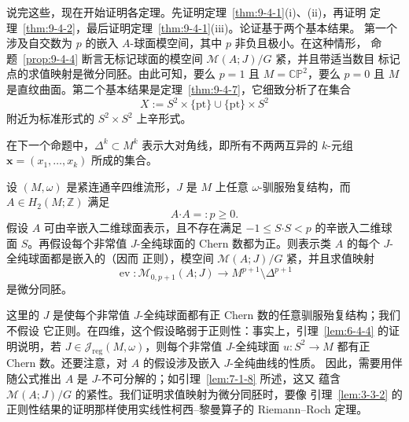 说完这些，现在开始证明各定理。先证明定理~\ref{thm:9-4-1}(i)、(ii)，再证明
定理~\ref{thm:9-4-2}，最后证明定理~\ref{thm:9-4-1}(iii)。论证基于两个基本结果。
第一个涉及自交数为 $p$ 的嵌入 $A$-球面模空间，其中 $p$ 非负且极小。在这种情形，
命题~\ref{prop:9-4-4} 断言无标记球面的模空间 $\mathcal M(A;J)/G$ 紧，并且带适当数目
标记点的求值映射是微分同胚。由此可知，要么 $p=1$ 且 $M=\mathbb{CP}^2$，要么
$p=0$ 且 $M$ 是直纹曲面。第二个基本结果是定理~\ref{thm:9-4-7}，它细致分析了在集合
\[
  X:=S^2\times\{\mathrm{pt}\}\cup\{\mathrm{pt}\}\times S^2
\]
附近为标准形式的 $S^2\times S^2$ 上辛形式。

在下一个命题中，$\Delta^k\subset M^k$ 表示大对角线，即所有不两两互异的
$k$-元组 $\mathbf x=(x_1,\ldots,x_k)$ 所成的集合。

\begin{proposition}\label{prop:9-4-4}
设 $(M,\omega)$ 是紧连通辛四维流形，$J$ 是 $M$ 上任意 $\omega$-驯服殆复结构，而
$A\in H_2(M;\mathbb Z)$ 满足
\[
  A\mathbin{\boldsymbol\cdot}A=:p\ge0.
\]
假设 $A$ 可由辛嵌入二维球面表示，且不存在满足
$-1\le S\mathbin{\boldsymbol\cdot}S<p$ 的辛嵌入二维球面 $S$。再假设每个非常值
$J$-全纯球面的 Chern 数都为正。则表示类 $A$ 的每个 $J$-全纯球面都是嵌入的（因而
正则），模空间 $\mathcal M(A;J)/G$ 紧，并且求值映射
\begin{equation}\label{eq:9-4-1}
  \operatorname{ev}:\mathcal M_{0,p+1}(A;J)
  \longrightarrow M^{p+1}\setminus\Delta^{p+1}
\end{equation}
是微分同胚。
\end{proposition}

这里的 $J$ 是使每个非常值 $J$-全纯球面都有正 Chern 数的任意驯服殆复结构；我们不假设
它正则。在四维，这个假设略弱于正则性：事实上，引理~\ref{lem:6-4-4} 的证明说明，若
$J\in\mathcal J_{\mathrm{reg}}(M,\omega)$，则每个非常值 $J$-全纯球面
$u:S^2\to M$ 都有正 Chern 数。还要注意，对 $A$ 的假设涉及嵌入 $J$-全纯曲线的性质。
因此，需要用伴随公式推出 $A$ 是 $J$-不可分解的；如引理~\ref{lem:7-1-8} 所述，这又
蕴含 $\mathcal M(A;J)/G$ 的紧性。我们证明求值映射为微分同胚时，要像
引理~\ref{lem:3-3-2} 的正则性结果的证明那样使用实线性柯西--黎曼算子的
Riemann--Roch 定理。

